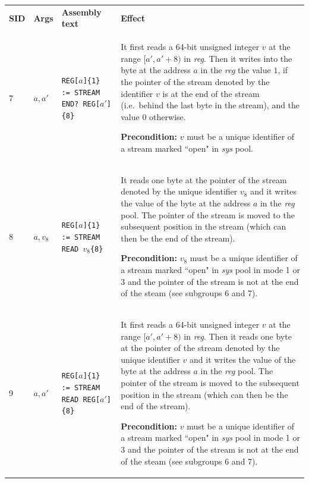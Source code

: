 \documentclass[10pt,twocolumn]{article}
\begin{document}
\begin{table}[!h]
\begin{center}
\def\arraystretch{1.5}
\begin{tabular}{lp{1.2cm}p{5.5cm}p{7.5cm}}
\textbf{SID} & \textbf{Args} & \textbf{Assembly text} & \textbf{Effect}
\\

7 & $ a,a' $ %
& \texttt{REG[}$ a $\texttt{]\{1\} := STREAM END? REG[}$ a' $\texttt{]\{8\}} %
& It first reads a 64-bit unsigned integer $ v $ at the range $ [a',a'+8) $ in
\textit{reg}. Then it writes into the byte at the address $ a $ in the
\textit{reg} the value $ 1 $, if the pointer of the stream denoted by the
identifier $ v $ is at the end of the stream (i.e.~behind the last byte in the
stream), and the value $ 0 $ otherwise.

\textbf{Precondition:} $ v $ must be a unique identifier of a stream marked
``open" in \textit{sys} pool. \\

8 & $ a,v_8 $ %
& \texttt{REG[}$ a $\texttt{]\{1\} := STREAM READ }$ v_8 $\texttt{\{8\}} %
& It reads one byte at the pointer of the stream denoted by the unique
identifier $ v_8 $ and it writes the value of the byte at the address $ a $ in
the \textit{reg} pool. The pointer of the stream is moved to the subsequent
position in the stream (which can then be the end of the stream).

\textbf{Precondition:} $ v_8 $ must be a unique identifier of a stream marked
``open" in \textit{sys} pool in mode 1 or 3 and the pointer of the stream is not
at the end of the steam (see subgroups 6 and 7). \\

9 & $ a,a' $ %
& \texttt{REG[}$ a $\texttt{]\{1\} := STREAM READ REG[}$ a' $\texttt{]\{8\}} %
& It first reads a 64-bit unsigned integer $ v $ at the range $ [a',a'+8) $ in
\textit{reg}. Then it reads one byte at the pointer of the stream denoted by the
unique identifier $ v $ and it writes the value of the byte at the address $ a $
in the \textit{reg} pool. The pointer of the stream is moved to the subsequent
position in the stream (which can then be the end of the stream).

\textbf{Precondition:} $ v $ must be a unique identifier of a stream marked
``open" in \textit{sys} pool in mode 1 or 3 and the pointer of the stream is not
at the end of the steam (see subgroups 6 and 7). \\


\end{tabular}
\end{center}
\end{table}
\end{document}
